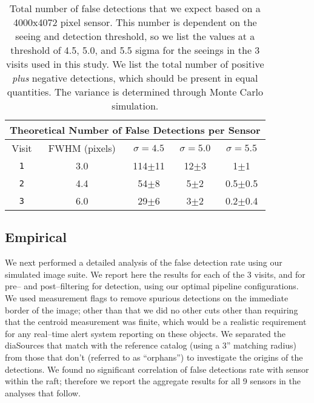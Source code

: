 \documentclass[iop]{emulateapj}
\begin{document}
\begin{table*}[t]
\centering
\begin{tabular}{ccccc}
\hline
\multicolumn{5}{|c|}{Theoretical Number of False Detections per Sensor} \\
\hline
Visit    & FWHM (pixels) & $\sigma=4.5$ & $\sigma=5.0$ & $\sigma=5.5$\\
\hline
{\tt 1} & 3.0 & 114$\pm$11 & 12$\pm$3& 1$\pm$1\\
{\tt 2} & 4.4 & 54$\pm$8 & 5$\pm$2& 0.5$\pm$0.5\\
{\tt 3} & 6.0 & 29$\pm$6 & 3$\pm$2&0.2$\pm$0.4\\
\end{tabular}
\caption{{\rm Total number of false detections that we expect based on a 4000x4072 pixel sensor.
    This number is dependent on the seeing and detection threshold, so we list the values at a threshold of 4.5, 5.0, and 5.5 sigma for the seeings in the 3 visits used in this study.
    We list the total number of positive {\it plus} negative detections, which should be present in equal quantities.
    The variance is determined through Monte Carlo simulation.\label{tab-fp}}}
\end{table*}

\subsection{Empirical}

We next performed a detailed analysis of the false detection rate using our simulated image suite.
We report here the results for each of the 3 visits, and for pre-- and post--filtering for detection, using our optimal pipeline configurations.
We used measurement flags to remove spurious detections on the immediate border of the image; other than that we did no other cuts other than requiring that the centroid measurement was finite, which would be a realistic requirement for any real--time alert system reporting on these objects.
We separated the diaSources that match with the reference catalog (using a 3'' matching radius) from those that don't (referred to as ``orphans'') to investigate the origins of the detections.
We found no significant correlation of false detections rate with sensor within the raft; therefore we report the aggregate results for all 9 sensors in the analyses that follow.
\end{document}
